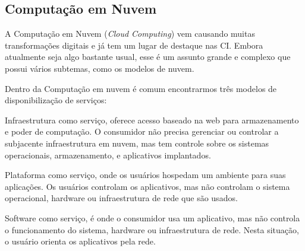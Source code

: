 \subsection{Computação em Nuvem}
A Computação em Nuvem (\textit{Cloud Computing}) vem causando muitas transformações digitais e já tem um lugar de destaque nas CI. Embora atualmente seja algo bastante usual, esse é um assunto grande e complexo que possui vários subtemas, como os modelos de nuvem.

Dentro da Computação em nuvem é comum encontrarmos três modelos de disponibilização de serviços: 

Infraestrutura como serviço, oferece acesso baseado na web para armazenamento e poder de computação. O consumidor não precisa gerenciar ou controlar a subjacente infraestrutura em nuvem, mas tem controle sobre os sistemas operacionais, armazenamento, e aplicativos implantados.

Plataforma como serviço, onde os usuários hospedam um
ambiente para suas aplicações. Os usuários controlam os aplicativos, mas não controlam o sistema operacional, hardware ou infraestrutura de rede que são usados.

Software como serviço, é onde o consumidor usa um aplicativo, mas não controla o funcionamento do sistema, hardware ou infraestrutura de rede. Nesta situação, o usuário orienta os aplicativos pela rede. 

